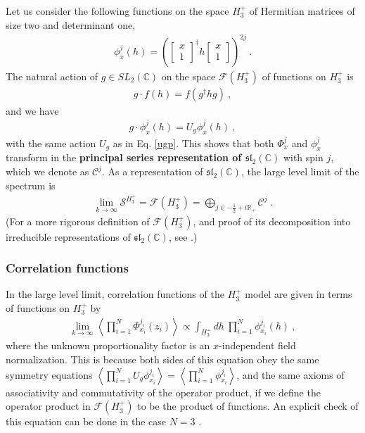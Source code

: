 \documentclass[12pt, a4paper, notitlepage, twoside]{report}
\numberwithin{equation}{section}
\theoremstyle{break}
\begin{document}
Let us consider the following functions on the space $H_3^+$ of Hermitian matrices of size two and determinant one,
\begin{align}
 \phi^j_{x}(h) = \left(\begin{bmatrix}
                                x \\ 1
                               \end{bmatrix}^\dagger 
h \begin{bmatrix}
   x \\ 1 
  \end{bmatrix}
 \right)^{2j}\ .
 \label{pjxh}
\end{align}
The natural action of $g\in SL_2({\mathbb{C}})$ on the space $\mathcal{F}(H_3^+)$ of functions on $H_3^+$ is
\begin{align}
 g\cdot f(h) = f(g^\dagger h g)\ ,
\end{align}
and we have 
\begin{align}
 g\cdot \phi^j_{x}(h) = U_g \phi^j_{x}(h)\ ,
\end{align}
with the same action $U_g$ as in Eq. \eqref{ugp}.
This shows that both $\Phi^j_x$ and $\phi^j_x$ transform in the \textbf{\boldmath principal series representation of $\mathfrak{sl}_2({\mathbb{C}})$} with spin $j$, which we denote as $\mathcal{C}^j$. 
As a representation of $\mathfrak{sl}_2({\mathbb{C}})$, the large level limit of the spectrum is 
\begin{align}
 \underset{k\to\infty}{\lim} \mathcal{S}^{H_3^+} =  \mathcal{F}(H_3^+) = \bigoplus_{j\in -\frac12+i{\mathbb{R}}_+} \mathcal{C}^j\ .
\end{align}
(For a more rigorous definition of $\mathcal{F}(H_3^+)$, and proof of its decomposition into irreducible representations of $\mathfrak{sl}_2({\mathbb{C}})$, see \cite{tes97b}.)


\subsubsection{Correlation functions}

In the large level limit, correlation functions of the $H_3^+$ model are given in terms of functions on $H_3^+$ by 
\begin{align}
 \underset{k\to \infty}{\lim} \left\langle \prod_{i=1}^N \Phi^{j_i}_{x_i}(z_i)\right\rangle \propto \int_{H_3^+} dh\ \prod_{i=1}^N \phi^{j_i}_{x_i}(h)\ , 
\end{align}
where the unknown proportionality factor is an $x$-independent field normalization.
This is because both sides of this equation obey the same symmetry equations $\left<\prod_{i=1}^N U_g \phi^{j_i}_{x_i} \right> = \left<\prod_{i=1}^N \phi^{j_i}_{x_i} \right>$, and the same axioms of associativity and commutativity of the operator product, if we define the operator product in $\mathcal{F}(H_3^+)$ to be the product of functions. 
An explicit check of this equation can be done in the case $N=3$ \cite{tes97b}.
\end{document}
